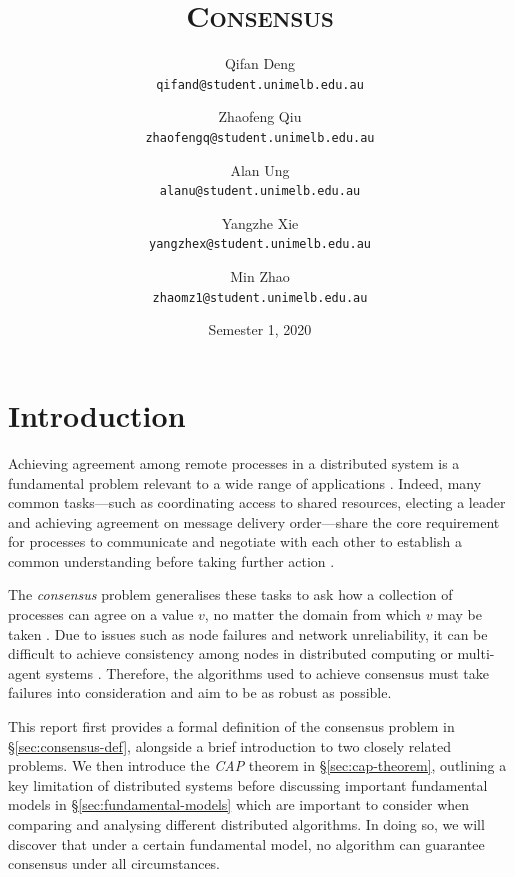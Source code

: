 \documentclass[12pt, a4paper]{article}
\title{\textsc{Consensus}}
\author{
  Qifan Deng \\
  \texttt{\small qifand@student.unimelb.edu.au}
  \and
  Zhaofeng Qiu \\
  \texttt{\small zhaofengq@student.unimelb.edu.au}
  \and
  Alan Ung \\
  \texttt{\small alanu@student.unimelb.edu.au}
  \and
  Yangzhe Xie \\
  \texttt{\small yangzhex@student.unimelb.edu.au}
  \and
  Min Zhao \\
  \texttt{\small zhaomz1@student.unimelb.edu.au}
}
\date{Semester 1, 2020}
\begin{document}
\maketitle
\thispagestyle{firststyle}


\section{Introduction}

Achieving agreement among remote processes in a distributed system is a
fundamental problem relevant to a wide range of applications
\cite{fischer1985impossibility, kshemkalyani_singhal_2008}. Indeed, many common
tasks---such as coordinating access to shared resources, electing a leader and
achieving agreement on message delivery order---share the core requirement for
processes to communicate and negotiate with each other to establish a common
understanding before taking further action \cite{kshemkalyani_singhal_2008,
coulouris2005distributed}.

The \textit{consensus} problem generalises these tasks to ask how a collection
of processes can agree on a value $v$, no matter the domain from which $v$ may
be taken \cite{coulouris2005distributed}. Due to issues such as node failures
and network unreliability, it can be difficult to achieve consistency among
nodes in distributed computing or multi-agent systems
\cite{coulouris2005distributed}. Therefore, the algorithms used to achieve
consensus must take failures into consideration and aim to be as robust as
possible.

This report first provides a formal definition of the consensus problem in
\S\ref{sec:consensus-def}, alongside a brief introduction to two closely related
problems. We then introduce the \textit{CAP} theorem in \S\ref{sec:cap-theorem},
outlining a key limitation of distributed systems before discussing important
fundamental models in \S\ref{sec:fundamental-models} which are important to
consider when comparing and analysing different distributed algorithms. In doing
so, we will discover that under a certain fundamental model, no algorithm can
guarantee consensus under all circumstances.
\end{document}

